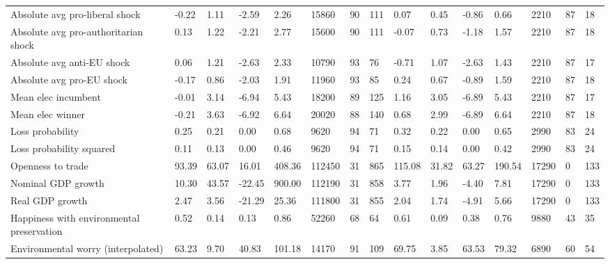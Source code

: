 \begin{longtable}{lllllllllllllll}
Absolute avg pro-liberal shock & -0.22 & 1.11 & -2.59 & 2.26 & 15860 & 90 & 111 & 0.07 & 0.45 & -0.86 & 0.66 & 2210 & 87 & 18\\
Absolute avg pro-authoritarian shock & 0.13 & 1.22 & -2.21 & 2.77 & 15600 & 90 & 111 & -0.07 & 0.73 & -1.18 & 1.57 & 2210 & 87 & 18\\
Absolute avg anti-EU shock & 0.06 & 1.21 & -2.63 & 2.33 & 10790 & 93 & 76 & -0.71 & 1.07 & -2.63 & 1.43 & 2210 & 87 & 17\\
\addlinespace
Absolute avg pro-EU shock & -0.17 & 0.86 & -2.03 & 1.91 & 11960 & 93 & 85 & 0.24 & 0.67 & -0.89 & 1.59 & 2210 & 87 & 18\\
Mean elec incumbent & -0.01 & 3.14 & -6.94 & 5.43 & 18200 & 89 & 125 & 1.16 & 3.05 & -6.89 & 5.43 & 2210 & 87 & 17\\
Mean elec winner & -0.21 & 3.63 & -6.92 & 6.64 & 20020 & 88 & 140 & 0.68 & 2.99 & -6.89 & 6.64 & 2210 & 87 & 18\\
Loss probability & 0.25 & 0.21 & 0.00 & 0.68 & 9620 & 94 & 71 & 0.32 & 0.22 & 0.00 & 0.65 & 2990 & 83 & 24\\
Loss probability squared & 0.11 & 0.13 & 0.00 & 0.46 & 9620 & 94 & 71 & 0.15 & 0.14 & 0.00 & 0.42 & 2990 & 83 & 24\\
\addlinespace
Openness to trade & 93.39 & 63.07 & 16.01 & 408.36 & 112450 & 31 & 865 & 115.08 & 31.82 & 63.27 & 190.54 & 17290 & 0 & 133\\
Nominal GDP growth & 10.30 & 43.57 & -22.45 & 900.00 & 112190 & 31 & 858 & 3.77 & 1.96 & -4.40 & 7.81 & 17290 & 0 & 133\\
Real GDP growth & 2.47 & 3.56 & -21.29 & 25.36 & 111800 & 31 & 855 & 2.04 & 1.74 & -4.91 & 5.66 & 17290 & 0 & 133\\
Happiness with environmental preservation & 0.52 & 0.14 & 0.13 & 0.86 & 52260 & 68 & 64 & 0.61 & 0.09 & 0.38 & 0.76 & 9880 & 43 & 35\\
Environmental worry (interpolated) & 63.23 & 9.70 & 40.83 & 101.18 & 14170 & 91 & 109 & 69.75 & 3.85 & 63.53 & 79.32 & 6890 & 60 & 54\\
\bottomrule
\end{longtable}
